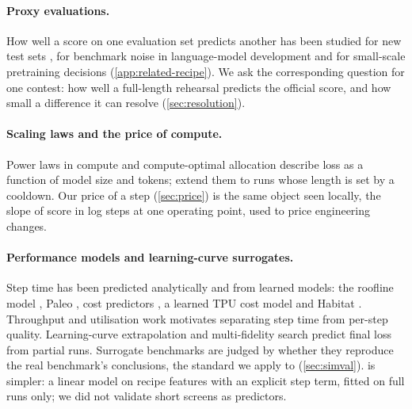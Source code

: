 \paragraph{Proxy evaluations.} How well a score on one evaluation set predicts another has been studied for new
test sets \citep{recht2019imagenet,miller2021accuracy}, for benchmark noise in language-model development
\citep{madaan2024variance,heineman2025signal} and for small-scale pretraining decisions
\citep{magnusson2025datadecide} (\cref{app:related-recipe}). We ask the corresponding question for one contest: how
well a full-length rehearsal predicts the official score, and how small a difference it can resolve
(\cref{sec:resolution}).

\paragraph{Scaling laws and the price of compute.} Power laws in compute \citep{kaplan2020scaling} and
compute-optimal allocation \citep{hoffmann2022chinchilla} describe loss as a function of model size and tokens;
\citet{hagele2024scaling} extend them to runs whose length is set by a cooldown. Our price of a step
(\cref{sec:price}) is the same object seen locally, the slope of score in log steps at one operating point, used to
price engineering changes.

\paragraph{Performance models and learning-curve surrogates.} Step time has been predicted analytically and from
learned models: the roofline model \citep{williams2009roofline}, Paleo \citep{qi2017paleo}, cost predictors
\citep{justus2018predicting}, a learned TPU cost model \citep{kaufman2021tpu} and Habitat \citep{yu2021habitat}.
Throughput and utilisation work \citep{narayanan2021megatron,korthikanti2023recompute,dao2022flashattention,dao2023flashattention2,chowdhery2023palm}
motivates separating step time from per-step quality. Learning-curve extrapolation
\citep{domhan2015extrapolating,swersky2014freezethaw,klein2017lcbnn,adriaensen2023lcpfn} and multi-fidelity search
\citep{li2018hyperband,falkner2018bohb} predict final loss from partial runs. Surrogate benchmarks
\citep{eggensperger2015surrogates,zela2022surrogate} are judged by whether they reproduce the real benchmark's
conclusions, the standard we apply to \ffsim{} (\cref{sec:simval}). \ffsim{} is simpler: a linear model on recipe
features with an explicit step term, fitted on full runs only; we did not validate short screens as predictors.

